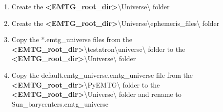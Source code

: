\begin{enumerate}
	\item Create the \textbf{\textless EMTG\_root\_dir\textgreater}\textbackslash Universe\textbackslash \hspace{1pt} folder
	\item Create the \textbf{\textless EMTG\_root\_dir\textgreater}\textbackslash Universe\textbackslash ephemeris\_files\textbackslash \hspace{1pt} folder
	\item Copy the *.emtg\_universe files from the  \textbf{\textless EMTG\_root\_dir\textgreater}\textbackslash testatron\textbackslash universe\textbackslash \hspace{1pt} folder to the \textbf{\textless EMTG\_root\_dir\textgreater}\textbackslash Universe\textbackslash \hspace{1pt} folder
	\item Copy the default.emtg\_universe.emtg\_universe file from the \textbf{\textless EMTG\_root\_dir\textgreater}\textbackslash PyEMTG\textbackslash \hspace{1pt} folder to the \textbf{\textless EMTG\_root\_dir\textgreater}\textbackslash Universe\textbackslash \hspace{1pt} folder and rename to Sun\_barycenters.emtg\_universe
\end{enumerate}